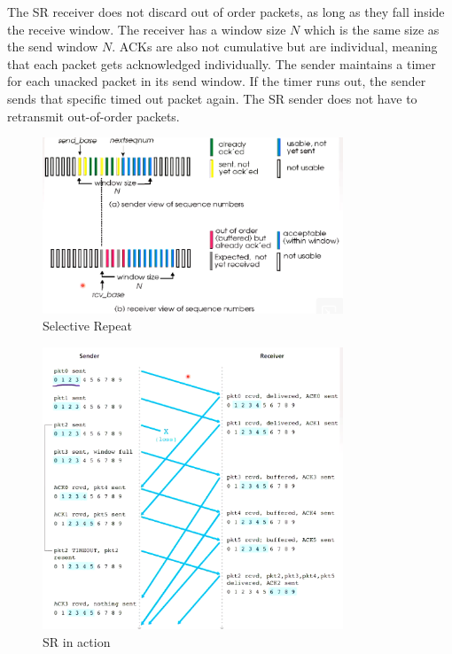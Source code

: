 \documentclass[a4paper]{article}
\theoremstyle{plain}
\theoremstyle{definition}
\newtheorem{defn}{Definition}[section]
\theoremstyle{remark}
\begin{document}
\begin{tcolorbox}[colback=black!3!white,colframe=black!60!white,title=\begin{defn}Selective Repeat (SR) \label{Selective Repeat (SR)}\end{defn}]
The SR receiver does not discard out of order packets, as long as they fall inside the receive window. The receiver has a window size $N$ which is the same size as the send window $N$. ACKs are also not cumulative but are individual, meaning that each packet gets acknowledged individually. The sender maintains a timer for each unacked packet in its send window. If the timer runs out, the sender sends that specific timed out packet again. The SR sender does not have to retransmit out-of-order packets. 
\begin{figure}[H]
	\centering
	\includegraphics[width=0.8\textwidth]{fiftynine.png}
	\caption{Selective Repeat}
	\label{fig:fiftynine-png}
\end{figure}
\begin{figure}[H]
	\centering
	\includegraphics[width=0.8\textwidth]{sixty.png}
	\caption{SR in action}
	\label{fig:sixty-png}
\end{figure}
\end{tcolorbox}
\end{document}
